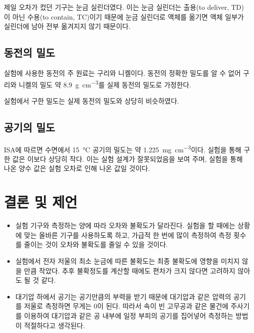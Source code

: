 \documentclass{GSHS-chemexp}
\begin{document}
	제일 오차가 컸던 기구는 눈금 실린더였다. 이는 눈금 실린더는
	출용(to deliver, TD)이 아닌 수용(to contain, TC)이기 때문에
	눈금 실린더로 액체를 옮기면 액체 일부가 실린더에 남아 전부 옮겨지지
	않기 때문이다.
	
	\subsection{동전의 밀도}
	실험에 사용한 동전의 주 원료는 구리와 니켈이다.
	동전의 정확한 밀도를 알 수 없어 구리와 니켈의 밀도
	약 \SI{8.9}{\gram\per\cubic\centi\metre}를 실제 동전의 밀도로 가정한다.
	
	실험에서 구한 밀도는 실제 동전의 밀도와 상당히 비슷하였다.
	
	\subsection{공기의 밀도}
	ISA에 따르면 수면에서 \SI{15}{\degreeCelsius} 공기의 밀도는
	약 \SI{1.225}{\milli\gram\per\cubic\centi\metre}이다.
	실험을 통해 구한 값은 이보다 상당히 작다.
	이는 실험 설계가 잘못되었음을 보여 주며,
	실험을 통해 나온 양수 값은 실험 오차로 인해 나온 값일 것이다.
	
	\section{결론 및 제언}
	\begin{itemize}
		\item 실험 기구와 측정하는 양에 따라 오차와 불확도가 달라진다.
		실험을 할 때에는 상황에 맞는 올바른 기구를 사용하도록 하고,
		가급적 한 번에 많이 측정하여 측정 횟수를 줄이는 것이
		오차와 불확도를 줄일 수 있을 것이다.
		\item 실험에서 전자 저울의 최소 눈금에 따른 불확도는 최종 
		불확도에 영향을 미치지 않을 만큼 작았다. 추후 불확정도를 계산할 
		때에도 편차가 크지 않다면 고려하지 않아도 될 것 같다.
		\item 대기압 하에서 공기는 공기만큼의 부력을 받기 때문에
		대기압과 같은 압력의 공기를 저울로 측정하면 무게는 0이 된다.
		따라서 속이 빈 고무공과 같은 물건에 주사기를 이용하여 대기압과 
		같은 공 내부에 일정 부피의 공기를 집어넣어 측정하는 방법이
		적절하다고 생각된다. \cite{kimandjang}
	\end{itemize}
	
\end{document}
